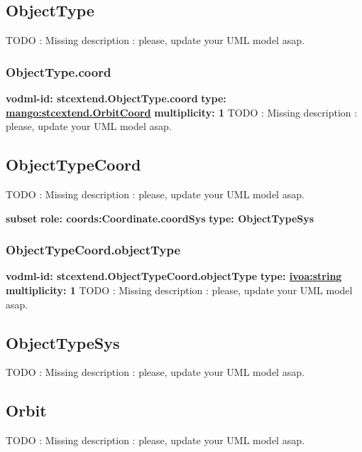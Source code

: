   \subsection{ObjectType}
  \label{sect:stcextend.ObjectType}
    TODO : Missing description : please, update your UML model asap.

    \subsubsection{ObjectType.coord}
      \textbf{vodml-id: stcextend.ObjectType.coord} \newline
      \textbf{type: \hyperref[sect:stcextend.OrbitCoord]{mango:stcextend.OrbitCoord}} \newline
      \textbf{multiplicity: 1} \newline 
      TODO : Missing description : please, update your UML model asap.

  \subsection{ObjectTypeCoord}
  \label{sect:stcextend.ObjectTypeCoord}
    TODO : Missing description : please, update your UML model asap.

    \noindent \textbf{subset} \newline
    \indent   \textbf{role: coords:Coordinate.coordSys} \newline
    \indent   \textbf{type: ObjectTypeSys} \newline


    \subsubsection{ObjectTypeCoord.objectType}
      \textbf{vodml-id: stcextend.ObjectTypeCoord.objectType} \newline
      \textbf{type: \hyperref[sect:ivoa]{ivoa:string}} \newline
      \textbf{multiplicity: 1} \newline 
      TODO : Missing description : please, update your UML model asap.

  \subsection{ObjectTypeSys}
  \label{sect:stcextend.ObjectTypeSys}
    TODO : Missing description : please, update your UML model asap.

  \subsection{Orbit}
  \label{sect:stcextend.Orbit}
    TODO : Missing description : please, update your UML model asap.

